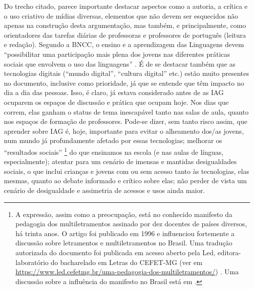 \documentclass[portuguese]{textolivre}
\begin{document}
Do trecho citado, parece importante destacar aspectos como a autoria, a crítica e o uso criativo de mídias diversas, elementos que não devem ser esquecidos não apenas na construção desta argumentação, mas também, e principalmente, como orientadores das tarefas diárias de professoras e professores de português (leitura e redação). Segundo a BNCC, o ensino e a aprendizagem das Linguagens devem ``possibilitar uma participação mais plena dos jovens nas diferentes práticas sociais que envolvem o uso das linguagens'' \cite[p. 473]{brasil2018}. É de se destacar também que as tecnologias digitais (``mundo digital'', ``cultura digital'' etc.) estão muito presentes no documento, inclusive como prioridade, já que se entende que têm impacto no dia a dia das pessoas. Isso, é claro, já estava considerado antes de as IAG ocuparem os espaços de discussão e prática que ocupam hoje. Nos dias que correm, elas ganham o status de tema inescapável tanto nas salas de aula, quanto nos espaços de formação de professores. Pode-se dizer, sem tanto risco assim, que aprender sobre IAG é, hoje, importante para evitar o alheamento dos/as jovens, num mundo já profundamente afetado por essas tecnologias; melhorar os ``resultados sociais'' \cite{cazden1996}\footnote{A expressão, assim como a preocupação, está no conhecido manifesto da pedagogia dos multiletramentos assinado por dez docentes de países diversos, há trinta anos. O artigo foi publicado em 1996 e influenciou fortemente a discussão sobre letramentos e multiletramentos no Brasil. Uma tradução autorizada do documento foi publicada em acesso aberto pela Led, editora-laboratório do bacharelado em Letras do CEFET-MG (ver em \url{https://www.led.cefetmg.br/uma-pedagogia-dos-multiletramentos/}) \cite{cazden2021}. Uma discussão sobre a influência do manifesto no Brasil está em \textcite{ribeiro2020}.} do que ensinamos na escola (e nas aulas de línguas, especialmente); atentar para um cenário de imensas e mantidas desigualdades sociais, o que inclui crianças e jovens com ou sem acesso tanto às tecnologias, elas mesmas, quanto ao debate informado e crítico sobre elas; não perder de vista um cenário de desigualdade e assimetria de acessos e usos ainda maior.  
\end{document}
